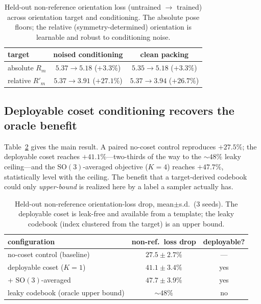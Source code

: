\documentclass[journal=acsodf,manuscript=article]{achemso}
\begin{document}
\begin{table}[t]\centering
\caption{Held-out non-reference orientation loss (untrained $\rightarrow$ trained)
across orientation target and conditioning. The absolute pose floors; the relative
(symmetry-determined) orientation is learnable and robust to conditioning noise.}
\label{tab:twobytwo}
\begin{tabular}{lcc}\toprule
target & noised conditioning & clean packing \\\midrule
absolute $R_m$  & $5.37\!\rightarrow\!5.18$ ($+3.3\%$) & $5.35\!\rightarrow\!5.18$ ($+3.3\%$) \\
relative $R'_m$ & $5.37\!\rightarrow\!3.91$ ($+27.1\%$) & $5.37\!\rightarrow\!3.94$ ($+26.7\%$) \\
\bottomrule
\end{tabular}
\end{table}

\subsection{Deployable coset conditioning recovers the oracle benefit}
\label{sec:gate}
Table~\ref{tab:gate} gives the main result. A paired no-coset control reproduces
$+27.5\%$; the deployable coset reaches $+41.1\%$---two-thirds of the way to the
$\sim\!48\%$ leaky ceiling---and the $\mathrm{SO}(3)$-averaged objective ($K{=}4$)
reaches $+47.7\%$, statistically level with the ceiling. The benefit that a
target-derived codebook could only \emph{upper-bound} is realized here by a label a
sampler actually has.

\begin{table}[t]\centering
\caption{Held-out non-reference orientation-loss drop, mean$\pm$s.d.\ (3 seeds).
The deployable coset is leak-free and available from a template; the leaky codebook
(index clustered from the target) is an upper bound.}
\label{tab:gate}
\begin{tabular}{lcc}\toprule
configuration & non-ref.\ loss drop & deployable? \\\midrule
no-coset control (baseline)            & $27.5\pm2.7\%$ & --- \\
deployable coset ($K{=}1$)             & $41.1\pm3.4\%$ & yes \\
\quad + $\mathrm{SO}(3)$-averaged      & $47.7\pm3.9\%$ & yes \\
leaky codebook (oracle upper bound)    & $\sim48\%$      & no  \\\bottomrule
\end{tabular}
\end{table}
\end{document}

